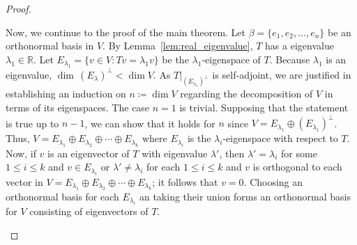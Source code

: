 \documentclass{article}
\begin{document}
\begin{proof}
\begin{description}
			Now, we continue to the proof of the main theorem.  Let \(\beta = \{e_1,
			e_2, \ldots, e_n\}\) be an orthonormal basis in \(V\).  By
			Lemma~\ref{lem:real_eigenvalue}, \(T\) has a eigenvalue \(\lambda_1\in
			\mathbb{R}\).  Let \(E_{\lambda_1} = \{v\in V : Tv = \lambda_1 v\}\) be the
			\(\lambda_1\)-eigenspace of \(T\).  Because \(\lambda_1\) is an eigenvalue,
			\(\dim\, (E_{\lambda})^{\perp} < \dim V\).  As
			\(T|_{(E_{\lambda_1})^{\perp}}\) is self-adjoint, we are justified in
			establishing an induction on \(n \coloneqq \dim V\) regarding the decomposition of
			\(V\) in terms of its eigenspaces.  The case \(n = 1\) is trivial.
			Supposing that the statement is true up to \(n-1\), we can show that it
			holds for \(n\) since \(V = E_{\lambda_1} \oplus
			(E_{\lambda_1})^{\perp}\).  Thus, \(V = E_{\lambda_1} \oplus E_{\lambda_2}
			\oplus \cdots \oplus E_{\lambda_k}\) where \(E_{\lambda_i}\) is the
			\(\lambda_i\)-eigenspace with respect to \(T\).  Now, if \(v\) is an
			eigenvector of \(T\) with eigenvalue \(\lambda'\), then \(\lambda' =
			\lambda_i\) for some \(1\leq i\leq k\) and \(v\in E_{\lambda_i}\) or
			\(\lambda' \neq \lambda_i\) for each \(1\leq i\leq k\) and \(v\) is
			orthogonal to each vector in \(V = E_{\lambda_1} \oplus E_{\lambda_2}
			\oplus \cdots \oplus E_{\lambda_k}\); it follows that \(v = 0\).
			Choosing an orthonormal basis for each \(E_{\lambda_i}\) an taking their
			union forms an orthonormal basis for \(V\) consisting of eigenvectors of
			\(T\).



\end{description}
\end{proof}
\end{document}
